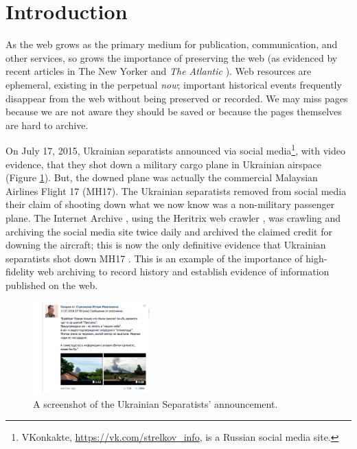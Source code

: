 \documentclass{sig-alternate}
\begin{document}



\section{Introduction}
\label{intro}

As the web grows as the primary medium for publication, communication, and other services, so grows the importance of preserving the web (as evidenced by recent articles in The New Yorker \cite{newyorker} and \emph{The Atlantic} \cite{lafrance}). Web resources are ephemeral, existing in the perpetual \emph{now}; important historical events frequently disappear from the web without being preserved or recorded. We may miss pages because we are not aware they should be saved or because the pages themselves are hard to archive. 

On July 17, 2015, Ukrainian separatists announced via social media\footnote{VKonkakte, \url{https://vk.com/strelkov_info}, is a Russian social media site.}, with video evidence, that they shot down a military cargo plane in Ukrainian airspace (Figure \ref{shotdown}). But, the downed plane was actually the commercial Malaysian Airlines Flight 17 (MH17). The Ukrainian separatists removed from social media their claim of shooting down what we now know was a non-military passenger plane. The Internet Archive \cite{iawebarchive}, using the Heritrix web crawler \cite{heritrix, Sigurosson:Incremental-Heritrix}, was crawling and archiving the social media site twice daily and archived the claimed credit for downing the aircraft; this is now the only definitive evidence that Ukrainian separatists shot down MH17 \cite{csm}. This is an example of the importance of high-fidelity web archiving to record history and establish evidence of information published on the web.

\begin{figure}[h!]
    \includegraphics[width=0.4\textwidth]{./imgs/shot_down.png}
  \caption{A screenshot of the Ukrainian Separatists' announcement.}
\label{shotdown}
\end{figure}%
\end{document}
